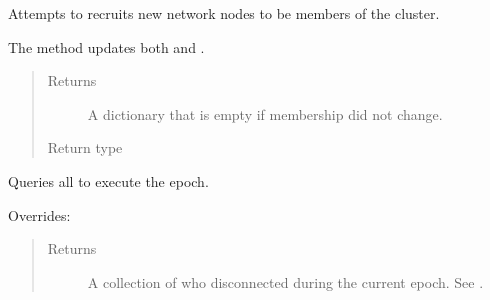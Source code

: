 \documentclass[letterpaper,10pt,english]{sphinxmanual}
\begin{document}
\begin{fulllineitems}
\begin{fulllineitems}
\end{fulllineitems}


\begin{fulllineitems}
\label{\detokenize{app.domain:app.domain.cluster_groups.HDFSCluster.membership_maintenance}}
Attempts to recruits new network nodes to be members of the cluster.

The method updates both  and .
\begin{quote}\begin{description}
\item[{Returns}] \leavevmode
A dictionary that is empty if membership did not change.

\item[{Return type}] \leavevmode
{\hyperref[\detokenize{app:app.type_hints.NodeDict}]{}}

\end{description}\end{quote}

\end{fulllineitems}


\begin{fulllineitems}
\label{\detokenize{app.domain:app.domain.cluster_groups.HDFSCluster.nodes_execute}}
Queries all {\hyperref[\detokenize{app.domain:app.domain.cluster_groups.Cluster.members}]{}} to execute the epoch.
\begin{description}
\item[{Overrides:}] \leavevmode
{\hyperref[\detokenize{app.domain:app.domain.cluster_groups.Cluster.nodes_execute}]{}}

\end{description}
\begin{quote}\begin{description}
\item[{Returns}] \leavevmode
A collection of {\hyperref[\detokenize{app.domain:app.domain.cluster_groups.Cluster.members}]{}} who disconnected
during the current epoch. See
{\hyperref[\detokenize{app.domain:app.domain.network_nodes.HDFSNode.update_status}]{}}.


\end{description}
\end{quote}
\end{fulllineitems}
\end{fulllineitems}
\end{document}
